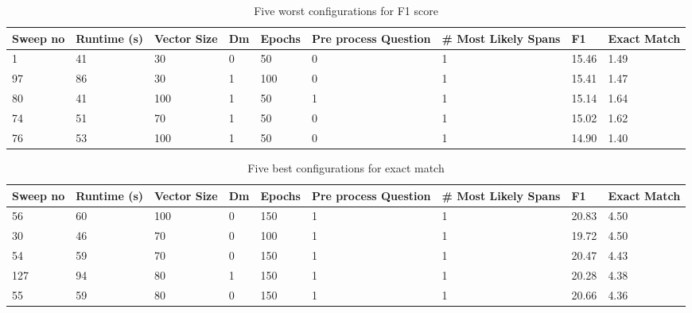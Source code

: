 \documentclass[11pt]{article}
\begin{document}
    \begin{table}[p]
        \centering
        \begin{tabularx}{\textwidth}{|X|X|X|X|X|X|X|X|X|}
            \hline
            Sweep no & Runtime (s) & Vector Size & Dm & Epochs & Pre process Question & \# Most Likely Spans & F1 & Exact Match \\ \hline
            1        & 41          & 30          & 0  & 50     & 0                    & 1                    & 15.46 & 1.49        \\ \hline
            97       & 86          & 30          & 1  & 100    & 0                    & 1                    & 15.41 & 1.47        \\ \hline
            80       & 41          & 100         & 1  & 50     & 1                    & 1                    & 15.14 & 1.64        \\ \hline
            74       & 51          & 70          & 1  & 50     & 0                    & 1                    & 15.02 & 1.62        \\ \hline
            76       & 53          & 100         & 1  & 50     & 0                    & 1                    & 14.90 & 1.40        \\ \hline
        \end{tabularx}
        \caption{Five worst configurations for F1 score}
        \label{table:5-worst-f1}
    \end{table}

    \begin{table}[p]
        \centering
        \begin{tabularx}{\textwidth}{|X|X|X|X|X|X|X|X|X|}
            \hline
            Sweep no & Runtime (s) & Vector Size & Dm & Epochs & Pre process Question & \# Most Likely Spans & F1 & Exact Match \\ \hline
            56       & 60          & 100         & 0  & 150    & 1                    & 1                    & 20.83 & 4.50        \\ \hline
            30       & 46          & 70          & 0  & 100    & 1                    & 1                    & 19.72 & 4.50        \\ \hline
            54       & 59          & 70          & 0  & 150    & 1                    & 1                    & 20.47 & 4.43        \\ \hline
            127      & 94          & 80          & 1  & 150    & 1                    & 1                    & 20.28 & 4.38        \\ \hline
            55       & 59          & 80          & 0  & 150    & 1                    & 1                    & 20.66 & 4.36        \\ \hline
        \end{tabularx}
        \caption{Five best configurations for exact match}
        \label{table:5-best-exact}
    \end{table}
\end{document}
